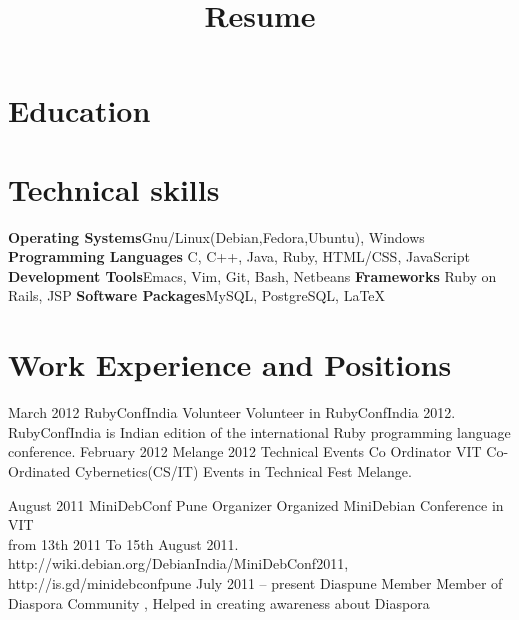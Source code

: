 \documentclass[11pt,a4paper]{moderncv}
\title{Resume}
\begin{document}
\maketitle

\section{Education}

\section{Technical skills}
\cvcomputer
{\textbf{Operating Systems}}{Gnu/Linux(Debian,Fedora,Ubuntu), Windows}
{\textbf{Programming Languages}}{ C, C++, Java, Ruby, HTML/CSS, JavaScript }
\cvcomputer
{\textbf{Development Tools}}{Emacs, Vim, Git, Bash, Netbeans}
{\textbf{Frameworks}}{ Ruby on Rails, JSP}
\cvcomputer
{\textbf{Software Packages}}{MySQL, PostgreSQL, LaTeX}
{}{}


\section{Work Experience and Positions}

\cventry    
            {March 2012}
            {RubyConfIndia}
            {Volunteer}
            {}
            {}
            {
              Volunteer in RubyConfIndia 2012. \\ 
              RubyConfIndia is Indian edition of the international
              Ruby programming language conference. 
            }
\cventry
            {February 2012}
            {Melange 2012 Technical Events }
            {Co Ordinator}
            {VIT}
            {}
            {
             Co-Ordinated Cybernetics(CS/IT) Events in Technical Fest
             Melange.
            } 

\cventry
            {August 2011}
            {MiniDebConf Pune}
            {Organizer}
            {}
            {}
            {
             Organized MiniDebian Conference in VIT \\
             from 13th 2011 To 15th August 2011.    \\
             http://wiki.debian.org/DebianIndia/MiniDebConf2011, \\
             http://is.gd/minidebconfpune
           }
\cventry
           {July 2011 -- present}
           {Diaspune}
           {Member}
           {}
           {}
           {
            Member of Diaspora Community , Helped in creating
            awareness about Diaspora 
           }
\end{document}
